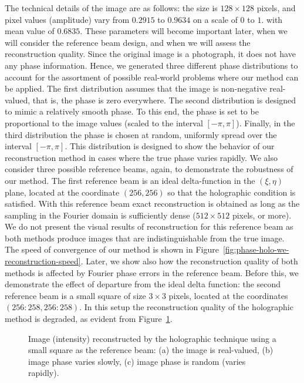 The technical
details of the image are as follows: the size is $128\times 128$
pixels, and pixel values (amplitude) vary from $0.2915$ to $0.9634$ on
a scale of $0$ to $1$.
with mean value of $0.6835$. These parameters will become important
later, when we will consider the reference beam design, and when we will
assess the reconstruction quality. Since the original image is a
photograph, it does not have any phase information. Hence, we
generated three different phase distributions to account for the
assortment of possible real-world problems where our method can be
applied. The first distribution assumes that the image is non-negative
real-valued, that is, the phase is zero everywhere. The second
distribution is designed to mimic a relatively smooth phase. To this
end, the phase is set to be proportional to the image values (scaled
to the interval $[-\pi,\pi]$). Finally, in the third distribution the
phase is chosen at random, uniformly spread over the interval
$[-\pi,\pi]$. This distribution is designed to show the behavior of
our reconstruction method in cases where the true phase varies
rapidly. We also consider three possible reference beams, again, to
demonstrate the robustness of our method. The first reference beam is
an ideal delta-function in the $(\xi,\eta)$ plane, located at the
coordinate $(256, 256)$ so that the holographic condition is
satisfied. With this reference beam exact reconstruction is obtained
as long as the sampling in the Fourier domain is sufficiently dense
($512\times512$ pixels, or more). We do not present the visual results
of reconstruction for this reference beam as both methods produce
images that are indistinguishable from the true image.  The speed of
convergence of our method is shown in
Figure~\ref{fig:phase-holo-we-reconstruction-speed}.  Later, we show also how the
reconstruction quality of both methods is affected by Fourier phase
errors in the reference beam. Before this, we demonstrate the effect
of departure from the ideal delta function: the second reference beam
is a small square of size $3\times3$ pixels, located at the
coordinates $(256:258,256:258)$.  In this setup the reconstruction
quality of the holographic method is degraded, as evident from
Figure~\ref{fig:holography-reconstruction-intensity}.
\begin{figure}[H]
  \centering
  \quad{}
  \quad{}
  \caption[Image reconstructed by the holographic
    technique using a small square as the reference beam]{Image (intensity) reconstructed by the holographic
    technique using a small square as the reference beam: (a) the
    image is real-valued, (b) image phase varies slowly, (c)
    image phase is random (varies rapidly).}
  \label{fig:holography-reconstruction-intensity}
\end{figure}


